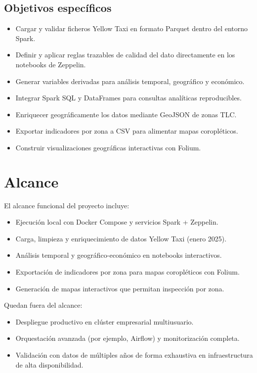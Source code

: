 \subsection{Objetivos específicos}
\begin{itemize}
	\item Cargar y validar ficheros Yellow Taxi en formato Parquet dentro del
	entorno Spark.
	\item Definir y aplicar reglas trazables de calidad del dato directamente
	en los notebooks de Zeppelin.
	\item Generar variables derivadas para análisis temporal, geográfico y económico.
	\item Integrar Spark SQL y DataFrames para consultas analíticas reproducibles.
	\item Enriquecer geográficamente los datos mediante GeoJSON de zonas TLC.
	\item Exportar indicadores por zona a CSV para alimentar mapas coropléticos.
	\item Construir visualizaciones geográficas interactivas con Folium.
\end{itemize}

\section{Alcance}
El alcance funcional del proyecto incluye:
\begin{itemize}
	\item Ejecución local con Docker Compose y servicios Spark + Zeppelin.
	\item Carga, limpieza y enriquecimiento de datos Yellow Taxi (enero 2025).
	\item Análisis temporal y geográfico-económico en notebooks interactivos.
	\item Exportación de indicadores por zona para mapas coropléticos con Folium.
	\item Generación de mapas interactivos que permitan inspección por zona.
\end{itemize}

Quedan fuera del alcance:
\begin{itemize}
	\item Despliegue productivo en clúster empresarial multiusuario.
	\item Orquestación avanzada (por ejemplo, Airflow) y monitorización completa.
	\item Validación con datos de múltiples años de forma exhaustiva en infraestructura
	de alta disponibilidad.
\end{itemize}

